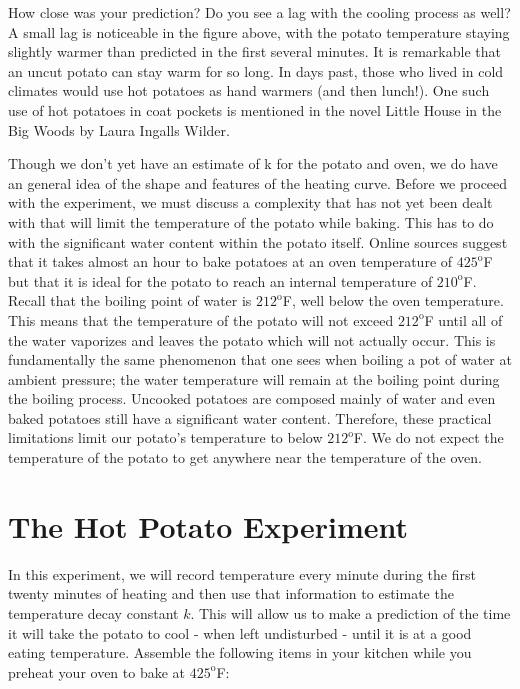 \documentclass{ximera}
\begin{document}
How close was your prediction?  Do you see a lag with the cooling process as well?  A small lag is noticeable in the figure above, with the potato temperature staying slightly warmer than predicted in the first several minutes.  It is remarkable that an uncut potato can stay warm for so long.  In days past, those who lived in cold climates would use hot potatoes as hand warmers (and then lunch!).  One such use of hot potatoes in coat pockets is mentioned in the novel Little House in the Big Woods by Laura Ingalls Wilder.






Though we don’t yet have an estimate of k for the potato and oven, we do have an general idea of the shape and features of the heating curve.  Before we proceed with the experiment, we must discuss a complexity that has not yet been dealt with that will limit the temperature of the potato while baking.  This has to do with the significant water content within the potato itself.  Online sources suggest that it takes almost an hour to bake potatoes at an oven temperature of $425^{\text{o}}$F but that it is ideal for the potato to reach an internal temperature of $210^{\text{o}}$F.  Recall that the boiling point of water is $212^{\text{o}}$F, well below the oven temperature.  This means that the temperature of the potato will not exceed $212^{\text{o}}$F until all of the water vaporizes and leaves the potato which will not actually occur.  This is fundamentally the same phenomenon that one sees when boiling a pot of water at ambient pressure; the water temperature will remain at the boiling point during the boiling process.  Uncooked potatoes are composed mainly of water and even baked potatoes still have a significant water content.  Therefore, these practical limitations limit our potato’s temperature to below $212^{\text{o}}$F.  We do not expect the temperature of the potato to get anywhere near the temperature of the oven.
  
\section*{The Hot Potato Experiment}
In this experiment, we will record temperature every minute during the first twenty minutes of heating and then use that information to estimate the temperature decay constant $k$.  This will allow us to make a prediction of the time it will take the potato to cool - when left undisturbed - until it is at a good eating temperature.
Assemble the following items in your kitchen while you preheat your oven to bake at $425^{\text{o}}$F:
 
\end{document}
